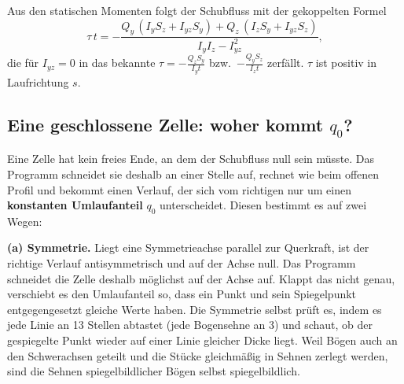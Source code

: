 Aus den statischen Momenten folgt der Schubfluss mit der gekoppelten Formel
\[
  \tau\,t = -\frac{Q_y\,(I_y S_z + I_{yz} S_y) + Q_z\,(I_z S_y + I_{yz} S_z)}{I_y I_z - I_{yz}^2} ,
\]
die für $I_{yz} = 0$ in das bekannte $\tau = -\frac{Q_z S_y}{I_y t}$ bzw.\ $-\frac{Q_y S_z}{I_z t}$
zerfällt. $\tau$ ist positiv in Laufrichtung $s$.

\subsection{Eine geschlossene Zelle: woher kommt \texorpdfstring{$q_0$}{q0}?}\label{sec:mathe-zelle}

Eine Zelle hat kein freies Ende, an dem der Schubfluss null sein müsste. Das Programm schneidet sie
deshalb an einer Stelle auf, rechnet wie beim offenen Profil und bekommt einen Verlauf, der sich
vom richtigen nur um einen \textbf{konstanten Umlaufanteil} $q_0$ unterscheidet. Diesen bestimmt
es auf zwei Wegen:

\textbf{(a) Symmetrie.} Liegt eine Symmetrieachse parallel zur Querkraft, ist der richtige Verlauf
antisymmetrisch und auf der Achse null. Das Programm schneidet die Zelle deshalb möglichst auf der
Achse auf. Klappt das nicht genau, verschiebt es den Umlaufanteil so, dass ein Punkt und sein
Spiegelpunkt entgegengesetzt gleiche Werte haben. Die Symmetrie selbst prüft es, indem es jede
Linie an 13 Stellen abtastet (jede Bogensehne an 3) und schaut, ob der gespiegelte Punkt wieder auf
einer Linie gleicher Dicke liegt. Weil Bögen auch an den Schwerachsen geteilt und die Stücke
gleichmäßig in Sehnen zerlegt werden, sind die Sehnen spiegelbildlicher Bögen selbst
spiegelbildlich.

